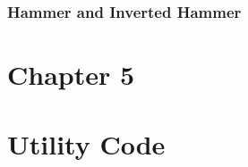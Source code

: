 \subsubsection{Hammer and Inverted Hammer}

\label{appA:Hammer}


\label{appA:Hammer_aroon}


\label{appA:Engulf}


\label{appA:Engulf_aroon}


\label{appA:Doji_aroon}

\section{Chapter 5}


\label{appA:ts_1}


\label{appA:ts_2}

\section{Utility Code}
\label{appA:utility}

